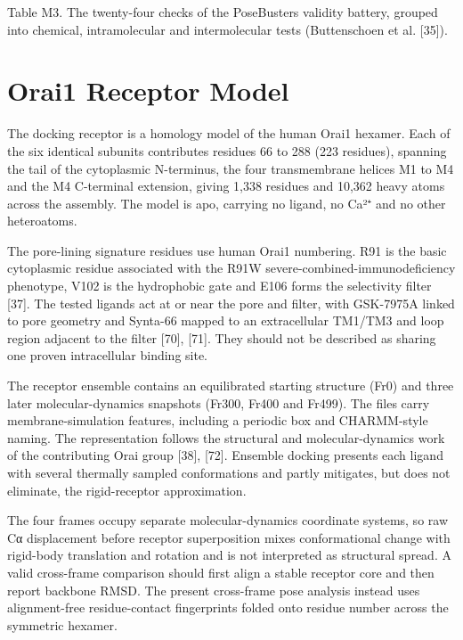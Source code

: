 Table M3. The twenty-four checks of the PoseBusters validity battery, grouped into chemical, intramolecular and intermolecular tests (Buttenschoen et al. {[}35{]}).

\hypertarget{orai1-receptor-model}{%
\section{Orai1 Receptor Model}\label{orai1-receptor-model}}

The docking receptor is a homology model of the human Orai1 hexamer. Each of the six identical subunits contributes residues 66 to 288 (223 residues), spanning the tail of the cytoplasmic N-terminus, the four transmembrane helices M1 to M4 and the M4 C-terminal extension, giving 1,338 residues and 10,362 heavy atoms across the assembly. The model is apo, carrying no ligand, no Ca²⁺ and no other heteroatoms.

The pore-lining signature residues use human Orai1 numbering. R91 is the basic cytoplasmic residue associated with the R91W severe-combined-immunodeficiency phenotype, V102 is the hydrophobic gate and E106 forms the selectivity filter {[}37{]}. The tested ligands act at or near the pore and filter, with GSK-7975A linked to pore geometry and Synta-66 mapped to an extracellular TM1/TM3 and loop region adjacent to the filter {[}70{]}, {[}71{]}. They should not be described as sharing one proven intracellular binding site.

The receptor ensemble contains an equilibrated starting structure (Fr0) and three later molecular-dynamics snapshots (Fr300, Fr400 and Fr499). The files carry membrane-simulation features, including a periodic box and CHARMM-style naming. The representation follows the structural and molecular-dynamics work of the contributing Orai group {[}38{]}, {[}72{]}. Ensemble docking presents each ligand with several thermally sampled conformations and partly mitigates, but does not eliminate, the rigid-receptor approximation.

The four frames occupy separate molecular-dynamics coordinate systems, so raw Cα displacement before receptor superposition mixes conformational change with rigid-body translation and rotation and is not interpreted as structural spread. A valid cross-frame comparison should first align a stable receptor core and then report backbone RMSD. The present cross-frame pose analysis instead uses alignment-free residue-contact fingerprints folded onto residue number across the symmetric hexamer.

